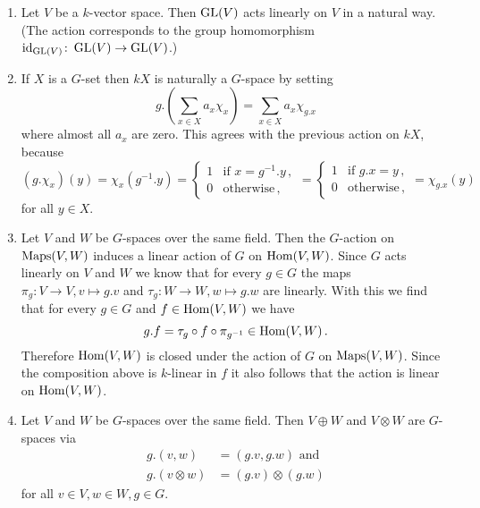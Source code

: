 \begin{expls}
  \begin{enumerate}[label=\emph{\alph*)},leftmargin=*]
    \item
      Let $V$ be a $k$-vector space.
      Then $\operatorname{GL}(V)$ acts linearly on $V$ in a natural way.
      (The action corresponds to the group homomorphism $\operatorname{id}_{\operatorname{GL}(V)} \colon \operatorname{GL}(V) \to \operatorname{GL}(V)$.)
    \item
      If $X$ is a $G$-set then $kX$ is naturally a $G$-space by setting
      \[
          g.\left(\sum_{x \in X} a_x \chi_x\right)
        = \sum_{x \in X} a_x \chi_{g.x}
      \]
      where almost all $a_x$ are zero.
      This agrees with the previous action on $kX$, because
      \[
          (g.\chi_x)(y)
        = \chi_x(g^{-1}.y)
        = \begin{cases}
            1 & \text{if } x = g^{-1}.y \,, \\
            0 & \text{otherwise} \,,
          \end{cases}
        = \begin{cases}
            1 & \text{if } g.x = y \,,  \\
            0 & \text{otherwise} \,,
          \end{cases}
        = \chi_{g.x}(y)
      \]
      for all $y \in X$.
    \item
      Let $V$ and $W$ be $G$-spaces over the same field.
      Then the $G$-action on $\operatorname{Maps}(V,W)$ induces a linear action of $G$ on $\operatorname{Hom}(V,W)$.
      Since $G$ acts linearly on $V$ and $W$ we know that for every $g \in G$ the maps $\pi_g \colon V \to V, v \mapsto g.v$ and $\tau_g \colon W \to W, w \mapsto g.w$ are linearly.
      With this we find that for every $g \in G$ and $f \in \operatorname{Hom}(V,W)$ we have
      \[
            g.f
        =   \tau_g \circ f \circ \pi_{g^{-1}}
        \in \operatorname{Hom}(V,W) \,.
      \]
      Therefore $\operatorname{Hom}(V,W)$ is closed under the action of $G$ on $\operatorname{Maps}(V,W)$.
      Since the composition above is $k$-linear in $f$ it also follows that the action is linear on $\operatorname{Hom}(V,W)$.
    \item
      Let $V$ and $W$ be $G$-spaces over the same field.
      Then $V \oplus W$ and $V \otimes W$ are $G$-spaces via
      \begin{align*}
            g.(v,w)
        &= (g.v,g.w)
           \text{ and }
            \tag{1}
        \\
            g.(v \otimes w)
        &=  (g.v) \otimes (g.w)
            \tag{2}
      \end{align*}
      for all $v \in V, w \in W, g \in G$. 

\end{enumerate}
\end{expls}
